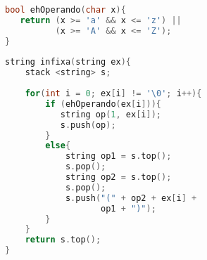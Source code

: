 \begin{lstlisting}[language=C++]
bool ehOperando(char x){ 
   return (x >= 'a' && x <= 'z') || 
          (x >= 'A' && x <= 'Z'); 
} 
  
string infixa(string ex){ 
    stack <string> s; 
  
    for(int i = 0; ex[i] != '\0'; i++){ 
        if (ehOperando(ex[i])){ 
           string op(1, ex[i]); 
           s.push(op); 
        }
        else{ 
            string op1 = s.top(); 
            s.pop(); 
            string op2 = s.top(); 
            s.pop(); 
            s.push("(" + op2 + ex[i] + 
                   op1 + ")"); 
        } 
    }
    return s.top(); 
}
\end{lstlisting}